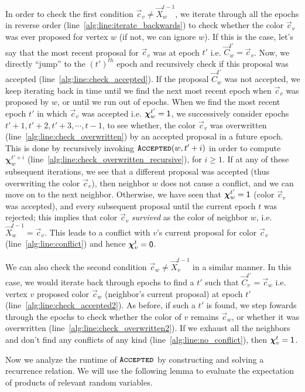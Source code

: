 In order to check the first condition $\vec c_v\not= \vec X^{t-1}_w$,
we iterate through all the epochs in reverse order (line~\ref{alg:line:iterate_backwards})
to check whether the color $\vec c_v$ was ever proposed for vertex $w$ (if not, we can ignore $w$).
If this is the case, let's say that the most recent proposal for $\vec c_v$ was at epoch $t'$ i.e. $\vec C^{t'}_w = \vec c_v$.
Now, we directly ``jump'' to the $(t')^{th}$ epoch and recursively check if this proposal was accepted (line~\ref{alg:line:check_accepted}).
If the proposal $\vec C^{t'}_w$ was not accepted, we keep iterating back in time until we find the next most recent epoch
when $\vec c_v$ was proposed by $w$, or until we run out of epochs.
When we find the most recent epoch $t'$ in which $\vec c_v$ was accepted i.e. $\bm\chi^{t'}_w = \mathsf{1}$,
we successively consider epochs $t'+1, t'+2, t'+3, \cdots, t-1$, to see whether,
the color $\vec c_v$ was overwritten (line~\ref{alg:line:check_overwritten}) by an accepted proposal in a future epoch.
This is done by recursively invoking $\texttt{\textsc{Accepted}}(w,t'+i)$ in order to compute $\bm\chi^{t'+i}_w$
(line~\ref{alg:line:check_overwritten_recursive}), for $i\ge 1$.
If at any of these subsequent iterations, we see that a different proposal was accepted (thus overwriting the color $\vec c_v$),
then neighbor $w$ does not cause a conflict, and we can move on to the next neighbor.
Otherwise, we have seen that $\bm\chi^{t'}_w = \mathsf{1}$ (color $\vec c_v$ was accepted),
and every subsequent proposal until the current epoch $t$ was rejected;
this implies that color $\vec c_v$ \emph{survived} as the color of neighbor $w$, i.e. $\vec X^{t-1}_w = \vec c_v$.
This leads to a conflict with $v$'s current proposal for color $\vec c_v$ (line~\ref{alg:line:conflict}) and hence $\bm\chi^t_v = \mathsf{0}$.

We can also check the second condition $\vec c_w\not= \vec X^{t-1}_v$ in a similar manner.
In this case, we would iterate back through epochs to find a $t'$ such that $\vec C^{t'}_v = \vec c_w$
i.e. vertex $v$ proposed color $\vec c_w$ (neighbor's current proposal) at epoch $t'$ (line~\ref{alg:line:check_accepted2}).
As before, if such a $t'$ is found, we step fowards through the epochs to check
whether the color of $v$ remains $\vec c_w$, or whether it was overwritten (line~\ref{alg:line:check_overwritten2}).
If we exhaust all the neighbors and don't find any conflicts of any kind (line~\ref{alg:line:no_conflict}), then $\bm\chi^t_v = \mathsf{1}$.

Now we analyze the runtime of $\texttt{\textsc{Accepted}}$ by constructing and solving a recurrence relation.
We will use the following lemma to evaluate the expectation of products of relevant random variables.

